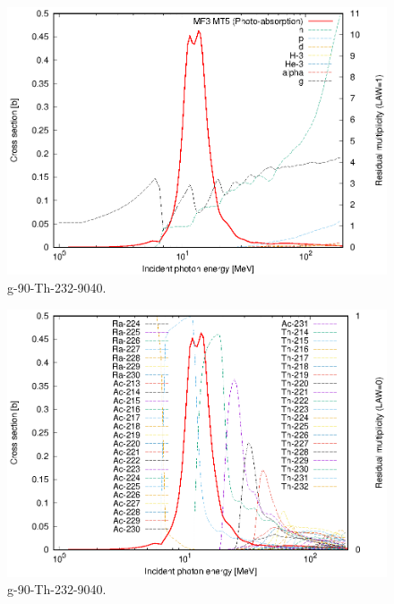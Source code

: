 \begin{figure}
 \includegraphics[width=\linewidth]{eps/g_90-Th-232_9040.eps}
  \caption{g-90-Th-232-9040.}
\end{figure}
\begin{figure}
 \includegraphics[width=\linewidth]{eps-law0/g_90-Th-232_9040.eps}
 \caption{g-90-Th-232-9040.}
\end{figure}
\newpage \clearpage

